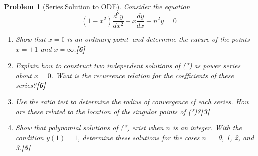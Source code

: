 \documentclass[a4paper]{article}
\theoremstyle{new}
\newtheorem{qns}{Problem}[section]
\begin{document}
\newpage
\begin{qns}[Series Solution to ODE]
Consider the equation
\begin{equation}
    (1-x^2)\frac{d^2y}{dx^2}-x\frac{dy}{dx}+n^2y=0\tag{*}
\end{equation}
\begin{enumerate}[label=(\alph*)]
\item Show that $x = 0$ is an ordinary point, and determine the nature of the points $x=\pm1$ and $x=\infty$.\hfill \textbf{[6]}
\item Explain how to construct two independent solutions of (*) as power series about $x = 0$. What is the recurrence relation for the coefficients of these series?\hfill \textbf{[6]}
\item Use the ratio test to determine the radius of convergence of each series. How are these related to the location of the singular points of (*)?\hfill \textbf{[3]}
\item Show that polynomial solutions of (*) exist when $n$ is an integer. With the condition $y(1) = 1$, determine these solutions for the cases $n =$ 0, 1, 2, and 3.\hfill \textbf{[5]}
\end{enumerate}
\end{qns}
\end{document}
